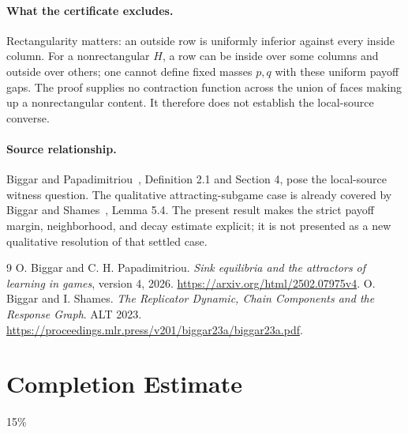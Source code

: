 \documentclass[11pt]{article}
\theoremstyle{definition}
\theoremstyle{remark}
\begin{document}
\paragraph{What the certificate excludes.}
Rectangularity matters: an outside row is uniformly inferior against every inside column. For a nonrectangular $H$, a row can be inside over some columns and outside over others; one cannot define fixed masses $p,q$ with these uniform payoff gaps. The proof supplies no contraction function across the union of faces making up a nonrectangular content. It therefore does not establish the local-source converse.

\paragraph{Source relationship.}
Biggar and Papadimitriou~\cite{source}, Definition 2.1 and Section 4, pose the local-source witness question. The qualitative attracting-subgame case is already covered by Biggar and Shames~\cite{chain}, Lemma 5.4. The present result makes the strict payoff margin, neighborhood, and decay estimate explicit; it is not presented as a new qualitative resolution of that settled case.

\begin{thebibliography}{9}
 O. Biggar and C. H. Papadimitriou.
\emph{Sink equilibria and the attractors of learning in games}, version 4, 2026.
\url{https://arxiv.org/html/2502.07975v4}.
 O. Biggar and I. Shames.
\emph{The Replicator Dynamic, Chain Components and the Response Graph}. ALT 2023.
\url{https://proceedings.mlr.press/v201/biggar23a/biggar23a.pdf}.
\end{thebibliography}

\section{Completion Estimate}
15\%
\end{document}
